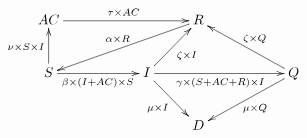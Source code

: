 \documentclass[convert]{standalone}
\begin{document}
\[
    \xymatrix{
        AC \ar[rrr]^{\tau \times AC} & & & R \ar[dlll]_{\alpha\times R} & \\
        S\ar[rr]_{\beta\times (I + AC) \times S}\ar[u]^{\nu \times S \times I} & & I \ar[ur]_{\zeta\times I}\ar[rrr]_{\gamma \times (S + AC + R) \times I} \ar[dr]_{\mu \times I} & & &
        Q\ar[ull]_{\zeta\times Q} \ar[dll]^{\mu \times Q}\\
        & &  & D &
    }
\]
\end{document}
